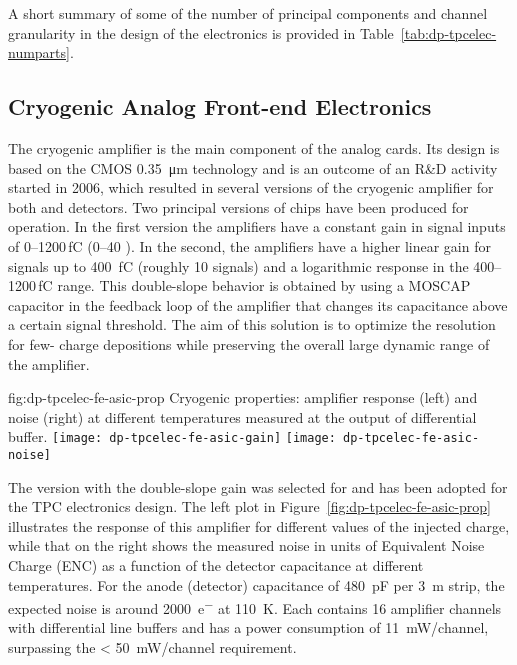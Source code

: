A short summary of some of  the number of principal components and channel granularity in the design of the \dual electronics is provided in Table~\ref{tab:dp-tpcelec-numparts}. 

\subsection{Cryogenic Analog Front-end Electronics}
\label{ssec:dp-tpcelec-design-cryofe}

The cryogenic amplifier  is the main component of the  analog cards. Its design is based on the CMOS \SI{0.35}{\micro\meter} technology and is an outcome of an R\&D  activity started in 2006, which resulted in several versions of the cryogenic amplifier for both \single and \dual {} detectors. Two principal versions of  chips have been produced for \dual {} operation. In the first version the amplifiers have a constant gain in signal inputs of \numrange{0}{1200}\,\si{\femto\coulomb} (\numrange{0}{40} ). In the second, the amplifiers have a higher linear gain for signals up to \SI{400}{\femto\coulomb} (roughly \num{10}  signals) and a logarithmic response in the \numrange{400}{1200}\,\si{\femto\coulomb} range. This double-slope behavior is obtained by using a MOSCAP capacitor in the feedback loop of the amplifier that changes its capacitance above a certain signal threshold. The aim of this solution is to optimize the resolution for few- charge depositions while preserving the overall large dynamic range of the amplifier.

\begin{dunefigure}{fig:dp-tpcelec-fe-asic-prop}
{Cryogenic   properties: amplifier response (left) and noise (right) at different temperatures measured at the output of differential buffer.}
\texttt{[image: dp-tpcelec-fe-asic-gain]}
\texttt{[image: dp-tpcelec-fe-asic-noise]}
\end{dunefigure}

The  version with the double-slope gain was selected for  and has been adopted for the \dual TPC electronics design. The left plot in Figure~\ref{fig:dp-tpcelec-fe-asic-prop} illustrates the response of this amplifier for different values of the injected charge, while that on the right shows the measured noise in units of Equivalent Noise Charge (ENC) as a function of the detector capacitance at different temperatures. 
For the  anode (detector) capacitance of \SI{480}{\pico\farad} per \SI{3}{\metre} strip, the expected noise is around \SI{2000}{e^{-}} at \SI{110}{\kelvin}. Each  contains \num{16} amplifier channels with differential line buffers and has a power consumption of \SI{11}{\milli\watt/channel}, surpassing the \SI{< 50}{\milli\watt/channel} requirement. 


